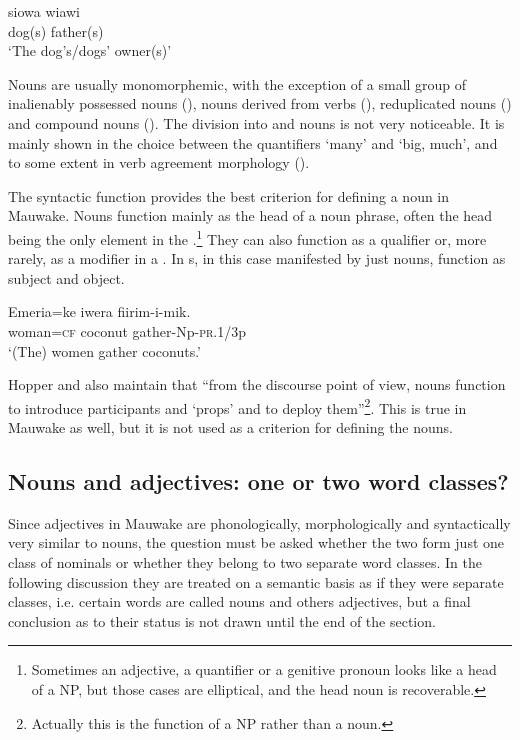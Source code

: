 \ea%
\label{ex:3:x1}
\gll siowa wiawi\\
dog(s) father(s)\\
\glt`The dog's/dogs' owner(s)'
\z

Nouns are usually monomorphemic, with the exception of a small group of inalienably possessed nouns (), nouns derived from verbs (), reduplicated nouns () and compound nouns (). The division into  and  nouns is not very noticeable. It is mainly shown in the choice between the quantifiers  `many' and  `big, much', and to some extent in verb agreement morphology ().

The syntactic function provides the best criterion for defining a noun in Mauwake. Nouns function mainly as the head of a noun phrase, often the head being the only element in the .\footnote{Sometimes an adjective, a quantifier or a genitive pronoun looks like a head of a NP, but those cases are elliptical, and the head noun is recoverable.} They can also function as a qualifier or, more rarely, as a modifier in a . In  s, in this case manifested by just nouns, function as subject and object.

\ea%
\label{ex:3:x2}
\gll Emeria=ke iwera fiirim-i-mik.\\
 woman=\textsc{cf} coconut gather-Np-\textsc{pr}.1/3p\\
\glt`(The) women gather coconuts.'
\z

Hopper and \citet[710]{Thompson1984} also maintain that {``from the discourse point of view, nouns function to introduce participants and `props' and to deploy them''}\footnote{Actually this is the function of a NP rather than a noun.}{.} This is true in Mauwake as well, but it is not used as a criterion for defining the nouns.

\subsection{Nouns and adjectives: one or two word classes?}\label{sec:3:2:2}
{}
Since adjectives in Mauwake are phonologically, morphologically and syntactically very similar to nouns, the question must be asked whether the two form just one class of nominals or whether they belong to two separate word classes. In the following discussion they are treated on a semantic basis as if they were separate classes, i.e. certain words are called nouns and others adjectives, but a final conclusion as to their status is not drawn until the end of the section.


